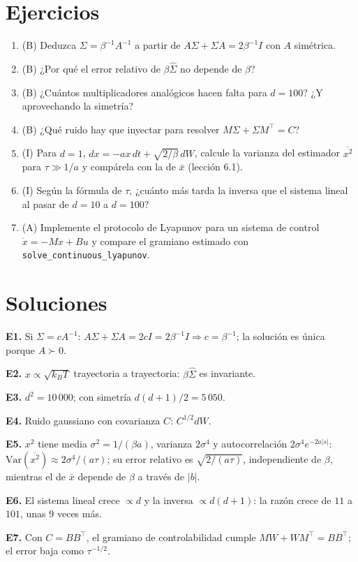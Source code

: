 \documentclass[11pt,a4paper]{article}
\begin{document}
\section{Ejercicios}
\begin{enumerate}[label=\textbf{E\arabic*.}]
\item (B) Deduzca $\Sigma=\beta^{-1}A^{-1}$ a partir de $A\Sigma+\Sigma A=2\beta^{-1}I$ con $A$ simétrica.
\item (B) ¿Por qué el error relativo de $\beta\hat\Sigma$ no depende de $\beta$?
\item (B) ¿Cuántos multiplicadores analógicos hacen falta para $d=100$? ¿Y aprovechando la simetría?
\item (B) ¿Qué ruido hay que inyectar para resolver $M\Sigma+\Sigma M^\top=C$?
\item (I) Para $d=1$, $dx=-ax\,dt+\sqrt{2/\beta}\,dW$, calcule la varianza del estimador $\overline{x^2}$ para $\tau\gg1/a$ y compárela con la de $\bar x$ (lección 6.1).
\item (I) Según la fórmula de $\tau$, ¿cuánto más tarda la inversa que el sistema lineal al pasar de $d=10$ a $d=100$?
\item (A) Implemente el protocolo de Lyapunov para un sistema de control $\dot x=-Mx+Bu$ y compare el gramiano estimado con \texttt{solve\_continuous\_lyapunov}.
\end{enumerate}
\section{Soluciones}
\begin{solucion}
\textbf{E1.} Si $\Sigma=cA^{-1}$: $A\Sigma+\Sigma A=2cI=2\beta^{-1}I\Rightarrow c=\beta^{-1}$; la solución es única porque $A\succ0$.

\textbf{E2.} $x\propto\sqrt{k_BT}$ trayectoria a trayectoria: $\beta\hat\Sigma$ es invariante.

\textbf{E3.} $d^2=10\,000$; con simetría $d(d+1)/2=5\,050$.

\textbf{E4.} Ruido gaussiano con covarianza $C$: $C^{1/2}dW$.

\textbf{E5.} $x^2$ tiene media $\sigma^2=1/(\beta a)$, varianza $2\sigma^4$ y autocorrelación $2\sigma^4e^{-2a|s|}$: $\mathrm{Var}(\overline{x^2})\approx2\sigma^4/(a\tau)$; su error relativo es
$\sqrt{2/(a\tau)}$, independiente de $\beta$, mientras el de $\bar x$ depende de $\beta$ a través de $|b|$.

\textbf{E6.} El sistema lineal crece $\propto d$ y la inversa $\propto d(d+1)$: la razón crece de $11$ a $101$, unas 9 veces más.

\textbf{E7.} Con $C=BB^\top$, el gramiano de controlabilidad cumple $M W+WM^\top=BB^\top$; el error baja como $\tau^{-1/2}$.
\end{solucion}
\end{document}
